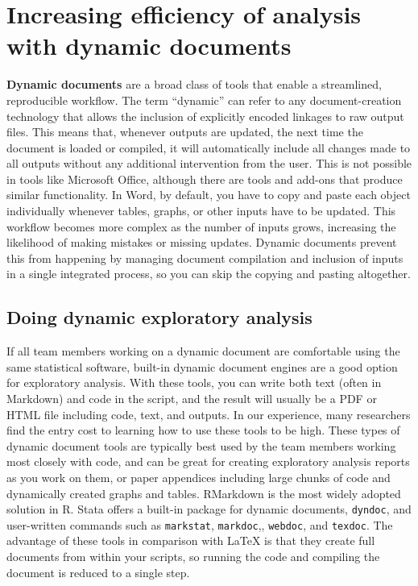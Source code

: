 \section{Increasing efficiency of analysis with dynamic documents}

\textbf{Dynamic documents}
are a broad class of tools that enable a streamlined, reproducible workflow.
The term ``dynamic'' can refer to any document-creation technology
that allows the inclusion of explicitly encoded linkages to raw output files.
This means that, whenever outputs are updated,
the next time the document is loaded or compiled, it will automatically include
all changes made to all outputs without any additional intervention from the user.
This is not possible in tools like Microsoft Office,
although there are tools and add-ons that produce similar functionality.
In Word, by default, you have to copy and paste each object individually
whenever tables, graphs, or other inputs have to be updated.
This workflow becomes more complex as the number of inputs grows,
increasing the likelihood of making mistakes or missing updates.
Dynamic documents prevent this from happening by managing document compilation and
inclusion of inputs in a single integrated process,
so you can skip the copying and pasting altogether.

\subsection{Doing dynamic exploratory analysis}

If all team members working on a dynamic document are comfortable using the same statistical software,
built-in dynamic document engines are a good option for exploratory analysis.
With these tools,
you can write both text (often in Markdown) and code in the script,
and the result will usually be a PDF or HTML file including code, text, and outputs.
In our experience, many researchers find the entry cost to learning how to use these tools to be high.
These types of dynamic document tools are typically best used by the team members working most closely with code,
and can be great for creating exploratory analysis reports as you work on them,
or paper appendices including large chunks of code and dynamically created graphs and tables.
RMarkdown is the most widely adopted solution in R.
Stata offers a built-in package for dynamic documents, \texttt{dyndoc},
and user-written commands such as \texttt{markstat},
\texttt{markdoc},,
\texttt{webdoc}, and
\texttt{texdoc}.
The advantage of these tools in comparison with LaTeX is that
they create full documents from within your scripts,
so running the code and compiling the document is reduced to a single step.

